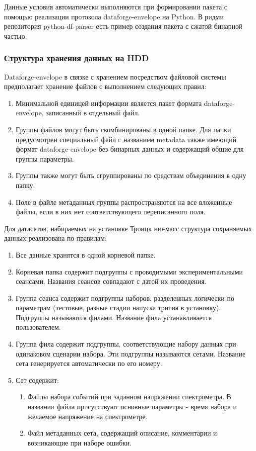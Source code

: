 \documentclass[a4paper,14pt]{extreport}
\begin{document}
Данные условия автоматически выполняются при формировании пакета с помощью реализации протокола  dataforge-envelope на Python. В ридми репозитория python-df-parser\cite{python-df-parser} есть пример создания пакета с сжатой бинарной частью.

\subsubsection{Структура хранения данных на HDD}
Dataforge-envelope в связке с хранением посредством файловой системы предполагает хранение файлов с выполнением следующих правил:
\begin{enumerate}
    \item Минимальной единицей информации является пакет формата dataforge-envelope, записанный в отдельный файл.
    \item Группы файлов могут быть скомбинированы в одной папке. Для папки предусмотрен специальный файл с названием metadata также имеющий формат dataforge-envelope без бинарных данных и содержащий общие для группы параметры.
    \item Группы также могут быть сгруппированы по средствам объединения в одну папку.
    \item Поле в файле метаданных группы распространяются на все вложенные файлы, если в них нет соответствующего переписанного поля.
\end{enumerate}

Для датасетов, набираемых на установке Троицк ню-масс структура сохраняемых данных реализована по правилам:
\begin{enumerate}
    \item Все данные хранятся в одной корневой папке.
    \item Корневая папка содержит подгруппы с проводимыми экспериментальными сеансами. Названия сеансов совпадают с датой их проведения.
    \item Группа сеанса содержит подгруппы наборов, разделенных логически по параметрам (тестовые, разные стадии напуска трития в установку). Подгруппы называются филами. Название фила устанавливается пользователем.
    \item Группа фила содержит подгруппы, соответствующие набору данных при одинаковом сценарии набора. Эти подгруппы называются сетами. Название сета генерируется автоматически по его номеру.
    \item Сет содержит: \begin{enumerate}
        \item Файлы набора событий при заданном напряжении спектрометра. В названии файла присутствуют основные параметры - время набора и желаемое напряжение на спектрометре.
        \item Файл метаданных сета, содержащий описание, комментарии и возникающие при наборе ошибки.
    \end{enumerate}
\end{enumerate}
\end{document}
